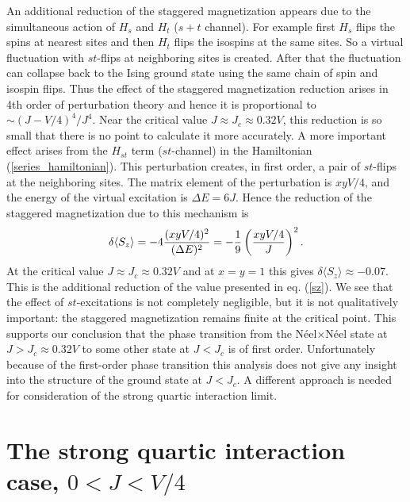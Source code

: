 An additional reduction of the staggered magnetization appears due
to the simultaneous action of $H_s$ and $H_t$ ($s+t$ channel). For example
first $H_s$ flips the spins at nearest sites and then $H_t$ flips
the isospins at the same sites. So a virtual fluctuation with
$st$-flips at neighboring sites is created. After that the
fluctuation can collapse back to the Ising ground state using the
same chain of spin and isospin flips. Thus the effect of the
staggered magnetization reduction arises in 4th order of
perturbation theory and hence it is proportional to 
$\sim (J-V/4)^4/J^4$. Near the critical value
 $J \approx J_c \approx 0.32V$,
this reduction is so small that there is no point to calculate it
more accurately.
A more important effect arises from the $H_{st}$ term ($st$-channel)
in the Hamiltonian (\ref{series_hamiltonian}). This perturbation
creates, in first order, a pair of $st$-flips at the neighboring 
sites. The matrix element of the perturbation is $xyV/4$, and the
energy of the virtual excitation is $\Delta E= 6J$. Hence the
reduction of the staggered magnetization due to this mechanism is
\begin{equation}
\label{dds}
\delta \langle S_z \rangle =-4{{(xyV/4)^2}\over{(\Delta E)^2}}=-{1\over{9}}
\left({{xyV/4}\over{J}}\right)^2.
\end{equation}
At the critical value $J\approx J_c \approx 0.32 V$ and at $x=y=1$ 
this gives $\delta \langle S_z \rangle \approx -0.07$. This is the additional 
reduction of the value presented in eq. (\ref{sz}). We see that
the effect of $st$-excitations is not completely negligible, but
it is not qualitatively important: the staggered magnetization
remains finite at the critical point.
This supports our conclusion that the phase transition from the
N\'eel$\times$N\'eel state at $J > J_c \approx 0.32V$
to some other state at $J < J_c$  is of first order.
Unfortunately because of the first-order phase transition this
analysis does not give any insight into the structure of the
ground state at $J < J_c$. A different approach is needed for
consideration of the strong quartic interaction limit.

\section{The strong quartic interaction case, $0<J< V/4$}

